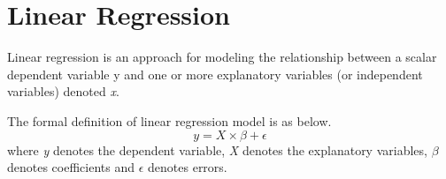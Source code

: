 \documentclass[11pt, conference]{IEEEtran}
\begin{document}


%
%




\section{Linear Regression}
Linear regression is an approach for modeling the relationship between a scalar dependent variable y and one or more explanatory variables (or independent variables) denoted \emph{x}\cite{ref3}. 

The formal definition of linear regression model is as below.
$$y = X \times \beta + \epsilon$$
where \emph{y} denotes the dependent variable, \emph{X} denotes the explanatory variables, $\beta$ denotes coefficients and $\epsilon$ denotes errors.
\end{document}
